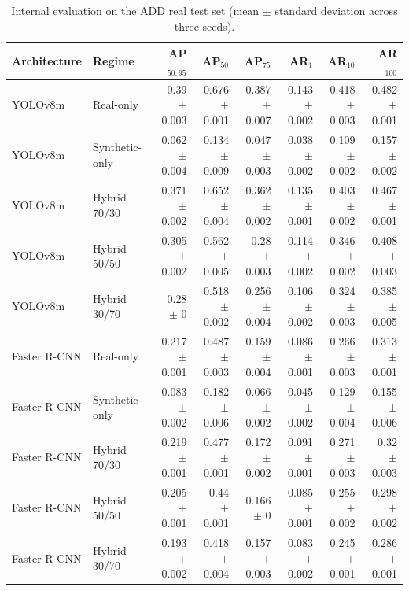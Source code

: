 \begin{table}
\caption{Internal evaluation on the ADD real test set (mean $\pm$ standard deviation across three seeds).}
\label{tab:add_internal_results}
\begin{tabular}{llrrrrrr}
\toprule
Architecture & Regime & AP$_{50:95}$ & AP$_{50}$ & AP$_{75}$ & AR$_{1}$ & AR$_{10}$ & AR$_{100}$ \\
\midrule
YOLOv8m & Real-only & 0.39 $\pm$ 0.003 & 0.676 $\pm$ 0.001 & 0.387 $\pm$ 0.007 & 0.143 $\pm$ 0.002 & 0.418 $\pm$ 0.003 & 0.482 $\pm$ 0.001 \\
YOLOv8m & Synthetic-only & 0.062 $\pm$ 0.004 & 0.134 $\pm$ 0.009 & 0.047 $\pm$ 0.003 & 0.038 $\pm$ 0.002 & 0.109 $\pm$ 0.002 & 0.157 $\pm$ 0.002 \\
YOLOv8m & Hybrid 70/30 & 0.371 $\pm$ 0.002 & 0.652 $\pm$ 0.004 & 0.362 $\pm$ 0.002 & 0.135 $\pm$ 0.001 & 0.403 $\pm$ 0.002 & 0.467 $\pm$ 0.001 \\
YOLOv8m & Hybrid 50/50 & 0.305 $\pm$ 0.002 & 0.562 $\pm$ 0.005 & 0.28 $\pm$ 0.003 & 0.114 $\pm$ 0.002 & 0.346 $\pm$ 0.002 & 0.408 $\pm$ 0.003 \\
YOLOv8m & Hybrid 30/70 & 0.28 $\pm$ 0 & 0.518 $\pm$ 0.002 & 0.256 $\pm$ 0.004 & 0.106 $\pm$ 0.002 & 0.324 $\pm$ 0.003 & 0.385 $\pm$ 0.005 \\
Faster R-CNN & Real-only & 0.217 $\pm$ 0.001 & 0.487 $\pm$ 0.003 & 0.159 $\pm$ 0.004 & 0.086 $\pm$ 0.001 & 0.266 $\pm$ 0.003 & 0.313 $\pm$ 0.001 \\
Faster R-CNN & Synthetic-only & 0.083 $\pm$ 0.002 & 0.182 $\pm$ 0.006 & 0.066 $\pm$ 0.002 & 0.045 $\pm$ 0.002 & 0.129 $\pm$ 0.004 & 0.155 $\pm$ 0.006 \\
Faster R-CNN & Hybrid 70/30 & 0.219 $\pm$ 0.001 & 0.477 $\pm$ 0.001 & 0.172 $\pm$ 0.002 & 0.091 $\pm$ 0.001 & 0.271 $\pm$ 0.003 & 0.32 $\pm$ 0.003 \\
Faster R-CNN & Hybrid 50/50 & 0.205 $\pm$ 0.001 & 0.44 $\pm$ 0.001 & 0.166 $\pm$ 0 & 0.085 $\pm$ 0.001 & 0.255 $\pm$ 0.002 & 0.298 $\pm$ 0.002 \\
Faster R-CNN & Hybrid 30/70 & 0.193 $\pm$ 0.002 & 0.418 $\pm$ 0.004 & 0.157 $\pm$ 0.003 & 0.083 $\pm$ 0.002 & 0.245 $\pm$ 0.001 & 0.286 $\pm$ 0.001 \\
\bottomrule
\end{tabular}
\end{table}

